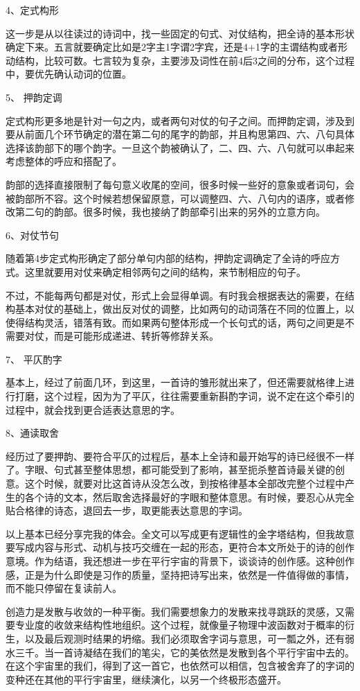 \documentclass{article}
\begin{document}
4、定式构形

这一步是从以往读过的诗词中，找一些固定的句式、对仗结构，把全诗的基本形状确定下来。五言就要确定比如是2字主1字谓2字宾，还是4+1字的主谓结构或者形动结构，比较可数。七言较为复杂，主要涉及词性在前4后3之间的分布，这个过程中，要优先确认动词的位置。

5、 押韵定调

定式构形更多地是针对一句之内，或者两句对仗的句子之间。而押韵定调，涉及到要从前面几个环节确定的潜在第二句的尾字的韵部，并且构思第四、六、八句具体选择该韵部下的哪个韵字。一旦这个韵被确认了，二、四、六、八句就可以串起来考虑整体的呼应和搭配了。

韵部的选择直接限制了每句意义收尾的空间，很多时候一些好的意象或者词句，会被韵部所不容。这个时候若想保留原意，可以调整四、六、八句内的语序，或者修改第二句的韵部。很多时候，我也接纳了韵部牵引出来的另外的立意方向。

6、对仗节句

随着第4步定式构形确定了部分单句内部的结构，押韵定调确定了全诗的呼应方式。这里就要用对仗来确定相邻两句之间的结构，来节制相应的句子。

不过，不能每两句都是对仗，形式上会显得单调。有时我会根据表达的需要，在结构基本对仗的基础上，做出反对仗的调整，比如两句的动词落在不同的位置上，以使得结构灵活，错落有致。而如果两句整体形成一个长句式的话，两句之间更是不需要对仗，而是可能形成递进、转折等修辞关系。

7、 平仄酌字

基本上，经过了前面几环，到这里，一首诗的雏形就出来了，但还需要就格律上进行打磨，这个过程，因为为了平仄，往往需要重新斟酌字词，说不定在这个牵引的过程中，就会找到更合适表达意思的字。

8、通读取舍

经历过了要押韵、要符合平仄的过程后，基本上全诗和最开始写的诗已经很不一样了。字眼、句式甚至整体思想，都可能受到了影响，甚至扼杀整首诗最关键的创意。这个时候，就要对比这首诗从没怎么改，到按格律基本全部改完整个过程中产生的各个诗的文本，然后取舍选择最好的字眼和整体意思。有时候，要忍心从完全贴合格律的诗态，退回去一步，取更能表达意思的字词。

以上基本已经分享完我的体会。全文可以写成更有逻辑性的金字塔结构，但我故意要写成内容与形式、动机与技巧交缠在一起的形态，更符合本文所处于的诗的创作意境。作为结语，我还想进一步在平行宇宙的背景下，谈谈诗的创作感。这种创作感，正是为什么即使是习作的质量，坚持把诗写出来，依然是一件值得做的事情，而不能只停留在复读前人。

创造力是发散与收敛的一种平衡。我们需要想象力的发散来找寻跳跃的灵感，又需要专业度的收敛来结构性地组织。这个过程，就像量子物理中波函数对于概率的衍生，以及最后观测时结果的坍缩。我们必须取舍字词与意思，可一瓢之外，还有弱水三千。当一首诗凝结在我们的笔尖，它的美依然是发散到各个平行宇宙中去的。在这个宇宙里的我们，得到了这一首它，也依然可以相信，包含被舍弃了的字词的变种还在其他的平行宇宙里，继续演化，以另一个终极形态盛开。
\end{document}
